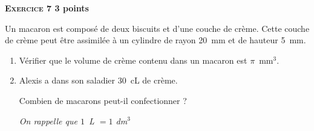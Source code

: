 \textbf{\textsc{Exercice 7} \hfill 3 points}

\medskip

Un macaron est composé de deux biscuits et d'une couche de crème. Cette
couche de crème peut être assimilée à un cylindre de rayon 20~mm et de
hauteur 5~mm.

\medskip

\begin{enumerate}
\item Vérifier que le volume de crème contenu dans un macaron est $\pi$~mm$^3$.
 
\item Alexis a dans son saladier 30~cL de crème.

Combien de macarons peut-il confectionner ?

\emph{On rappelle que $1$~{\rm L} $= 1$ {\rm dm}}\boldmath$^3$\unboldmath
\end{enumerate}

\bigskip

